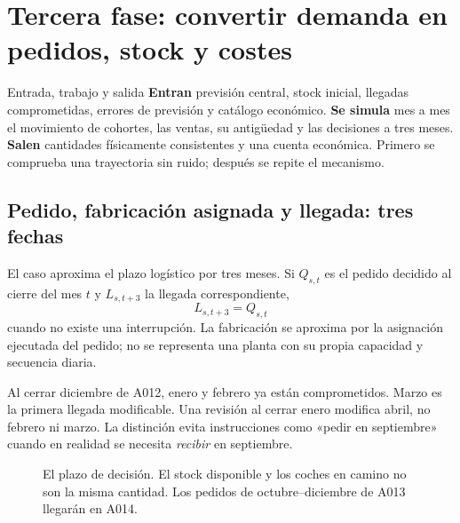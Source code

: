 \section{Tercera fase: convertir demanda en pedidos, stock y costes}\label{sec:simulacion}

\begin{idea}{Entrada, trabajo y salida}
\textbf{Entran} previsión central, stock inicial, llegadas comprometidas, errores
de previsión y catálogo económico. \textbf{Se simula} mes a mes el movimiento
de cohortes, las ventas, su antigüedad y las decisiones a tres meses.
\textbf{Salen} cantidades físicamente consistentes y una cuenta económica.
Primero se comprueba una trayectoria sin ruido; después se repite el mecanismo.
\end{idea}

\subsection{Pedido, fabricación asignada y llegada: tres fechas}
El caso aproxima el plazo logístico por tres meses. Si $Q_{s,t}$ es el pedido
decidido al cierre del mes $t$ y $L_{s,t+3}$ la llegada correspondiente,
\begin{equation}\label{eq:plazo}
 L_{s,t+3}=Q_{s,t}
\end{equation}
cuando no existe una interrupción. La fabricación se aproxima por la asignación
ejecutada del pedido; no se representa una planta con su propia capacidad y
secuencia diaria.

Al cerrar diciembre de A012, enero y febrero ya están comprometidos. Marzo es
la primera llegada modificable. Una revisión al cerrar enero modifica abril,
no febrero ni marzo. La distinción evita instrucciones como «pedir en septiembre»
cuando en realidad se necesita \emph{recibir} en septiembre.

\begin{figure}[htbp]\centering
{}
\caption{El plazo de decisión. El stock disponible y los coches en camino no son
la misma cantidad. Los pedidos de octubre--diciembre de A013 llegarán en A014.}
\label{fig:plazo}
\end{figure}

